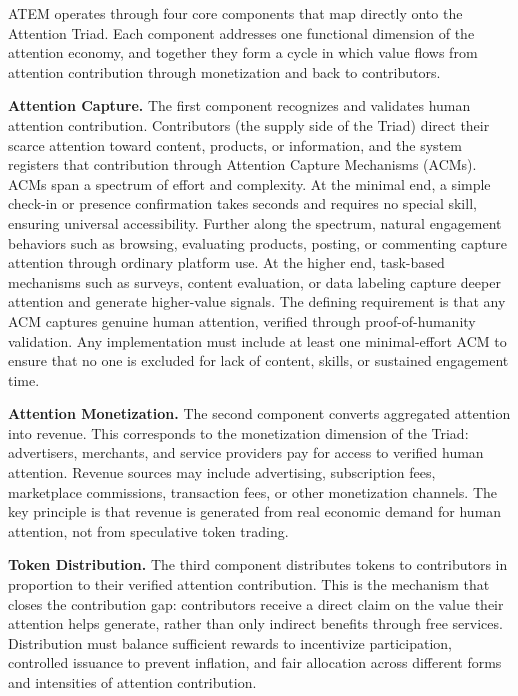 \documentclass[12pt, a4paper]{article}
\begin{document}
ATEM operates through four core components that map directly onto the Attention Triad. Each component addresses one functional dimension of the attention economy, and together they form a cycle in which value flows from attention contribution through monetization and back to contributors.

\textbf{Attention Capture.} The first component recognizes and validates human attention contribution. Contributors (the supply side of the Triad) direct their scarce attention toward content, products, or information, and the system registers that contribution through Attention Capture Mechanisms (ACMs). ACMs span a spectrum of effort and complexity. At the minimal end, a simple check-in or presence confirmation takes seconds and requires no special skill, ensuring universal accessibility. Further along the spectrum, natural engagement behaviors such as browsing, evaluating products, posting, or commenting capture attention through ordinary platform use. At the higher end, task-based mechanisms such as surveys, content evaluation, or data labeling capture deeper attention and generate higher-value signals. The defining requirement is that any ACM captures genuine human attention, verified through proof-of-humanity validation. Any implementation must include at least one minimal-effort ACM to ensure that no one is excluded for lack of content, skills, or sustained engagement time.

\textbf{Attention Monetization.} The second component converts aggregated attention into revenue. This corresponds to the monetization dimension of the Triad: advertisers, merchants, and service providers pay for access to verified human attention. Revenue sources may include advertising, subscription fees, marketplace commissions, transaction fees, or other monetization channels. The key principle is that revenue is generated from real economic demand for human attention, not from speculative token trading.

\textbf{Token Distribution.} The third component distributes tokens to contributors in proportion to their verified attention contribution. This is the mechanism that closes the contribution gap: contributors receive a direct claim on the value their attention helps generate, rather than only indirect benefits through free services. Distribution must balance sufficient rewards to incentivize participation, controlled issuance to prevent inflation, and fair allocation across different forms and intensities of attention contribution.
\end{document}
